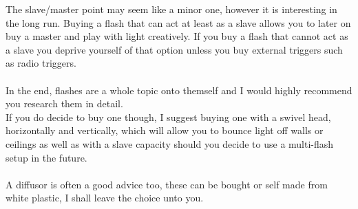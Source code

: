 The slave/master point may seem like a minor one, however it is interesting in the long run. Buying a flash that can act at least as a slave allows you to later on buy a master and play with light creatively. If you buy a flash that cannot act as a slave you deprive yourself of that option unless you buy external triggers such as radio triggers.
\\
\\
In the end, flashes are a whole topic onto themself and I would highly recommend you research them in detail.
\\
If you do decide to buy one though, I suggest buying one with a swivel head, horizontally and vertically, which will allow you to bounce light off walls or ceilings as well as with a slave capacity should you decide to use a multi-flash setup in the future.
\\
\\
A diffusor is often a good advice too, these can be bought or self made from white plastic, I shall leave the choice unto you.